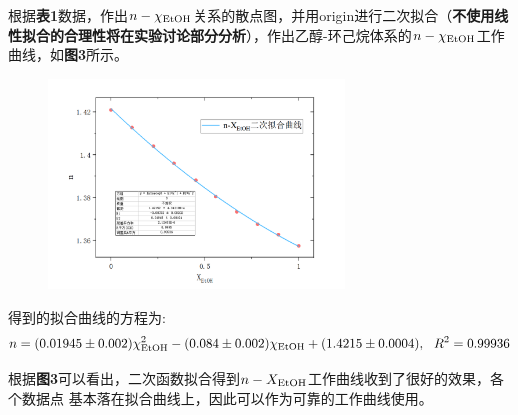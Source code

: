 \documentclass[12pt]{article}
\begin{document}
			 根据\textbf{表1}数据，作出$n-\chi_{\ce{EtOH}}$关系的散点图，并用origin进行二次拟合（\textbf{不使用线性拟合的合理性将在实验讨论部分分析}），作出乙醇-环己烷体系的$n-\chi_{\ce{EtOH}}$工作曲线，如\textbf{图3}所示。\par
			\begin{figure}[!h]
				\centering
				\includegraphics[width=0.70\textwidth]{3.png}
			\end{figure}
			得到的拟合曲线的方程为:
			$$
 			n=(0.01945\pm 0.002)\chi^{2}_{\ce{EtOH}}-(0.084\pm 0.002)\chi_{\ce{EtOH}}+(1.4215\pm 0.0004),\  \ R^{2}=0.99936
			$$
			\par
			根据\textbf{图3}可以看出，二次函数拟合得到$n-X_{\rm EtOH}$工作曲线收到了很好的效果，各个数据点
			基本落在拟合曲线上，因此可以作为可靠的工作曲线使用。
\end{document}

